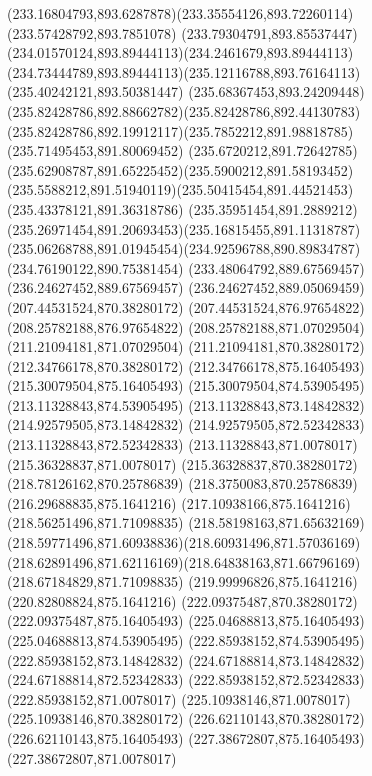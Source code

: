{{	\curveto(233.16804793,893.6287878)(233.35554126,893.72260114)(233.57428792,893.7851078)
	\curveto(233.79304791,893.85537447)(234.01570124,893.89444113)(234.2461679,893.89444113)
	\curveto(234.73444789,893.89444113)(235.12116788,893.76164113)(235.40242121,893.50381447)
	\curveto(235.68367453,893.24209448)(235.82428786,892.88662782)(235.82428786,892.44130783)
	\curveto(235.82428786,892.19912117)(235.7852212,891.98818785)(235.71495453,891.80069452)
	\curveto(235.6720212,891.72642785)(235.62908787,891.65225452)(235.5900212,891.58193452)
	\curveto(235.5588212,891.51940119)(235.50415454,891.44521453)(235.43378121,891.36318786)
	\curveto(235.35951454,891.2889212)(235.26971454,891.20693453)(235.16815455,891.11318787)
	\curveto(235.06268788,891.01945454)(234.92596788,890.89834787)(234.76190122,890.75381454)
	\lineto(233.48064792,889.67569457)
	\lineto(236.24627452,889.67569457)
	\lineto(236.24627452,889.05069459)
	\closepath
	\moveto(207.44531524,870.38280172)
	\lineto(207.44531524,876.97654822)
	\lineto(208.25782188,876.97654822)
	\lineto(208.25782188,871.07029504)
	\lineto(211.21094181,871.07029504)
	\lineto(211.21094181,870.38280172)
	\closepath
	\moveto(212.34766178,870.38280172)
	\lineto(212.34766178,875.16405493)
	\lineto(215.30079504,875.16405493)
	\lineto(215.30079504,874.53905495)
	\lineto(213.11328843,874.53905495)
	\lineto(213.11328843,873.14842832)
	\lineto(214.92579505,873.14842832)
	\lineto(214.92579505,872.52342833)
	\lineto(213.11328843,872.52342833)
	\lineto(213.11328843,871.0078017)
	\lineto(215.36328837,871.0078017)
	\lineto(215.36328837,870.38280172)
	\closepath
	\moveto(218.78126162,870.25786839)
	\lineto(218.3750083,870.25786839)
	\lineto(216.29688835,875.1641216)
	\lineto(217.10938166,875.1641216)
	\lineto(218.56251496,871.71098835)
	\curveto(218.58198163,871.65632169)(218.59771496,871.60938836)(218.60931496,871.57036169)
	\curveto(218.62891496,871.62116169)(218.64838163,871.66796169)(218.67184829,871.71098835)
	\lineto(219.99996826,875.1641216)
	\lineto(220.82808824,875.1641216)
	\closepath
	\moveto(222.09375487,870.38280172)
	\lineto(222.09375487,875.16405493)
	\lineto(225.04688813,875.16405493)
	\lineto(225.04688813,874.53905495)
	\lineto(222.85938152,874.53905495)
	\lineto(222.85938152,873.14842832)
	\lineto(224.67188814,873.14842832)
	\lineto(224.67188814,872.52342833)
	\lineto(222.85938152,872.52342833)
	\lineto(222.85938152,871.0078017)
	\lineto(225.10938146,871.0078017)
	\lineto(225.10938146,870.38280172)
	\closepath
	\moveto(226.62110143,870.38280172)
	\lineto(226.62110143,875.16405493)
	\lineto(227.38672807,875.16405493)
	\lineto(227.38672807,871.0078017)
}}
